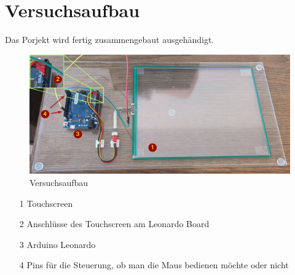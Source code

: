 \chapter{Versuchsaufbau}    
Das Porjekt wird fertig zusammengebaut ausgehändigt.
\begin{figure}[ht!]
    \centering
    \includegraphics[width=\linewidth]{fig/raster/aufbau_annotated.jpg}
    \caption{Versuchsaufbau}
    \label{fig:aufbau}
\end{figure}
\begin{itemize}
    \item[1] Touchscreen
    \item[2] Anschlüsse des Touchscreen am Leonardo Board
    \item[3] Arduino Leonardo
    \item[4] Pins für die Steuerung, ob man die Maus bedienen möchte oder nicht
\end{itemize}